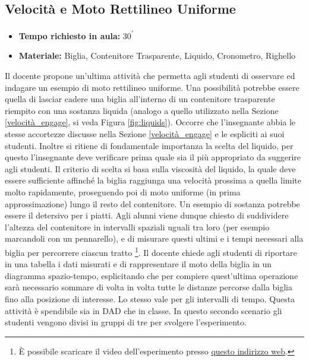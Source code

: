 \documentclass{report} \usepackage[T1]{fontenc} \usepackage[italian]{babel}
\begin{document}
\subsection{Velocità e Moto Rettilineo Uniforme}

\begin{itemize}
\item \textbf{Tempo richiesto in aula:} 30\textsuperscript{$\prime$}
\item \textbf{Materiale:} Biglia, Contenitore Trasparente, Liquido, Cronometro, Righello
\end{itemize}

Il docente propone un’ultima attività che permetta agli studenti di osservare
ed indagare un esempio di moto rettilineo uniforme. Una possibilità potrebbe
essere quella di lasciar cadere una biglia all’interno di un contenitore
trasparente riempito con una sostanza liquida (analogo a quello utilizzato
nella Sezione \ref{velocità_engage}, si veda Figura \ref{fig:liquids}).
Occorre che l’insegnante abbia
le stesse accortezze discusse nella Sezione \ref{velocità_engage} e
le espliciti ai suoi studenti. Inoltre si ritiene di fondamentale
importanza la scelta del liquido, per questo
l’insegnante deve verificare prima quale sia il più appropriato da suggerire
agli studenti. Il criterio di scelta si basa sulla viscosità del liquido, la
quale deve essere sufficiente affinché la biglia raggiunga una velocità
prossima a quella limite molto rapidamente, proseguendo poi di moto uniforme
(in prima approssimazione)
lungo il resto del contenitore. Un esempio di sostanza potrebbe essere il
detersivo per i piatti. Agli alunni viene dunque chiesto di suddividere l'altezza
del contenitore in intervalli spaziali uguali tra loro (per esempio marcandoli con
un pennarello), e di misurare questi ultimi e i tempi necessari
alla biglia per percorrere ciascun
tratto \footnote{\`E possibile scaricare il video dell'esperimento presso
          \textcolor{blue}{\href{https://github.com/savaroskij/PED1/blob/master/progetto_finale/media/video/biglia_detersivo.mp4?raw=true}{questo indirizzo web}}.
         }.
Il docente chiede agli studenti di riportare in una tabella i dati
misurati e di rappresentare il moto della biglia in un diagramma
spazio-tempo, esplicitando che per compiere quest'ultima operazione
sarà necessario sommare di volta in volta tutte le distanze percorse
dalla biglia fino alla posizione di interesse. Lo stesso vale per
gli intervalli di tempo.
Questa attività è
spendibile sia in DAD che in classe. In questo secondo scenario gli studenti
vengono divisi in gruppi di tre per svolgere l’esperimento.
\end{document}
